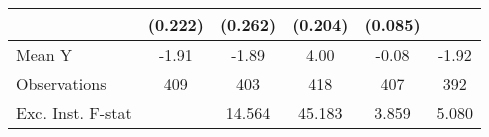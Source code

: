 {\begin{tabular}{l*{5}{c}}
            &     (0.222)         &     (0.262)         &     (0.204)         &     (0.085)         &                     \\
\midrule
Mean Y      &       -1.91         &       -1.89         &        4.00         &       -0.08         &       -1.92         \\
Observations&         409         &         403         &         418         &         407         &         392         \\
Exc. Inst. F-stat&                     &      14.564         &      45.183         &       3.859         &       5.080         \\
\bottomrule
\end{tabular}
}
